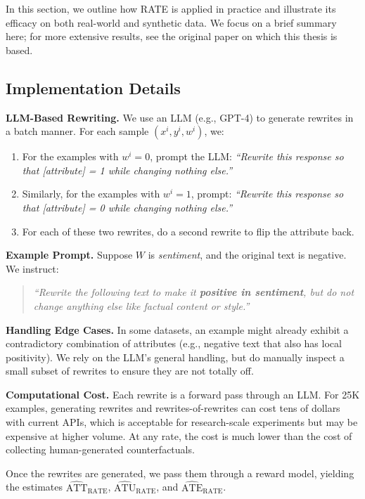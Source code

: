 In this section, we outline how RATE is applied in practice and illustrate its efficacy on both real-world and synthetic data. We focus on a brief summary here; for more extensive results, see the original paper on which this thesis is based.

\subsection{Implementation Details}

\textbf{LLM-Based Rewriting.} We use an LLM (e.g., GPT-4) to generate rewrites in a batch manner. For each sample $(x^i, y^{i}, w^{i})$, we:
\begin{enumerate}
    \item For the examples with $w^{i} = 0$, prompt the LLM: \emph{``Rewrite this response so that [attribute] = 1 while changing nothing else.''}
    \item Similarly, for the examples with $w^{i} = 1$, prompt: \emph{``Rewrite this response so that [attribute] = 0 while changing nothing else.''}
    \item For each of these two rewrites, do a second rewrite to flip the attribute back.
\end{enumerate}

\textbf{Example Prompt.} Suppose $W$ is \emph{sentiment}, and the original text is negative. We instruct:
\begin{quote}
\textit{``Rewrite the following text to make it \textbf{positive in sentiment}, but do not change anything else like factual content or style.''}
\end{quote}

\textbf{Handling Edge Cases.} In some datasets, an example might already exhibit a contradictory combination of attributes (e.g., negative text that also has local positivity). We rely on the LLM’s general handling, but do manually inspect a small subset of rewrites to ensure they are not totally off.

\textbf{Computational Cost.} Each rewrite is a forward pass through an LLM. For 25K examples, generating rewrites and rewrites-of-rewrites can cost tens of dollars with current APIs, which is acceptable for research-scale experiments but may be expensive at higher volume. At any rate, the cost is much lower than the cost of collecting human-generated counterfactuals.

Once the rewrites are generated, we pass them through a reward model, yielding the estimates $\widehat{\text{ATT}}_{\text{RATE}}$, $\widehat{\text{ATU}}_{\text{RATE}}$, and $\widehat{\text{ATE}}_{\text{RATE}}$.

